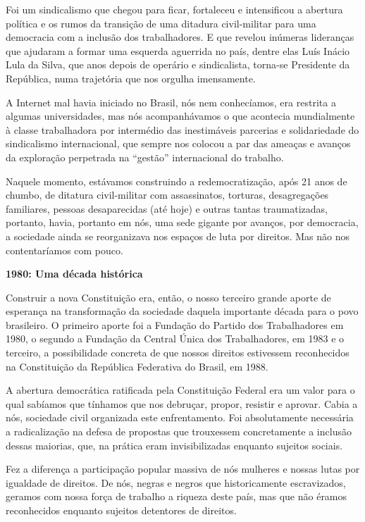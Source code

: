 Foi um sindicalismo que chegou para ficar, fortaleceu e intensificou a
abertura política e os rumos da transição de uma ditadura civil-militar
para uma democracia com a inclusão dos trabalhadores. E que revelou
inúmeras lideranças que ajudaram a formar uma esquerda aguerrida no
país, dentre elas Luís Inácio Lula da Silva, que anos depois de operário
e sindicalista, torna-se Presidente da República, numa trajetória que
nos orgulha imensamente.

A Internet mal havia iniciado no Brasil, nós nem conhecíamos, era
restrita a algumas universidades, mas nós acompanhávamos o que acontecia
mundialmente à classe trabalhadora por intermédio das inestimáveis
parcerias e solidariedade do sindicalismo internacional, que sempre nos
colocou a par das ameaças e avanços da exploração perpetrada na
``gestão'' internacional do trabalho.

Naquele momento, estávamos construindo a redemocratização, após 21 anos
de chumbo, de ditatura civil-militar com assassinatos, torturas,
desagregações familiares, pessoas desaparecidas (até hoje) e outras
tantas traumatizadas, portanto, havia, portanto em nós, uma sede gigante
por avanços, por democracia, a sociedade ainda se reorganizava nos
espaços de luta por direitos. Mas não nos contentaríamos com pouco.

\textbf{1980: Uma década histórica}

Construir a nova Constituição era, então, o nosso terceiro grande aporte
de esperança na transformação da sociedade daquela importante década
para o povo brasileiro. O primeiro aporte foi a Fundação do Partido dos
Trabalhadores em 1980, o segundo a Fundação da Central Única dos
Trabalhadores, em 1983 e o terceiro, a possibilidade concreta de que
nossos direitos estivessem reconhecidos na Constituição da República
Federativa do Brasil, em 1988.

A abertura democrática ratificada pela Constituição Federal era um valor
para o qual sabíamos que tínhamos que nos debruçar, propor, resistir e
aprovar. Cabia a nós, sociedade civil organizada este enfrentamento. Foi
absolutamente necessária a radicalização na defesa de propostas que
trouxessem concretamente a inclusão dessas maiorias, que, na prática
eram invisibilizadas enquanto sujeitos sociais.

Fez a diferença a participação popular massiva de nós mulheres e nossas
lutas por igualdade de direitos. De nós, negras e negros que
historicamente escravizados, geramos com nossa força de trabalho a
riqueza deste país, mas que não éramos reconhecidos enquanto sujeitos
detentores de direitos.

